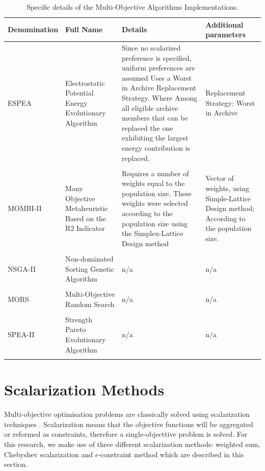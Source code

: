 \begin{table}[H]
    \begin{tabular}{p{}p{}p{}p{}}
    \hline
    Denomination  & Full Name & Details & Additional parameters \\
    \hline
    ESPEA         & Electrostatic Potential Energy Evolutionary Algorithm  & Since no scalarized preference is specified, uniform preferences are assumed
    Uses a Worst in Archive Replacement Strategy. 
    Where Among all eligible archive members that can be replaced the one exhibiting the largest energy contribution is replaced. & Replacement Strategy: Worst in Archive \\ \\
    MOMBI-II        & Many Objective Metaheuristic Based on the R2 Indicator & Requires a number of weights equal to the population size. These weights were selected according to the population size using the Simplex-Lattice Design method & Vector of weights, using Simple-Lattice Design method; According to the population size. \\ \\
    NSGA-II       & Non-dominated Sorting Genetic Algorithm               & n/a & n/a \\ \\
    MORS          & Multi-Objective Random Search                                          & n/a  & n/a \\ \\ 
    SPEA-II        & Strength Pareto Evolutionary Algorithm                 & n/a  & n/a \\ \\
    \hline                                                                                                                 
    \end{tabular}
    \caption{Specific details of the Multi-Objective Algorithms Implementations.}
    \label{table:(MOA)_details}
\end{table}

\section{Scalarization Methods}
\label{sec:scalarization}

Multi-objective optimisation problems are classically solved using scalarization techniques \cite{Emmerich2018}. Scalarization means that the objective functions will be aggregated or reformed as constraints, therefore a single-objecttive problem is solved. For this research, we make use of three different scalarization methods: weighted sum, Chebyshev scalarization and $\epsilon$-constraint method which are described in this section.

